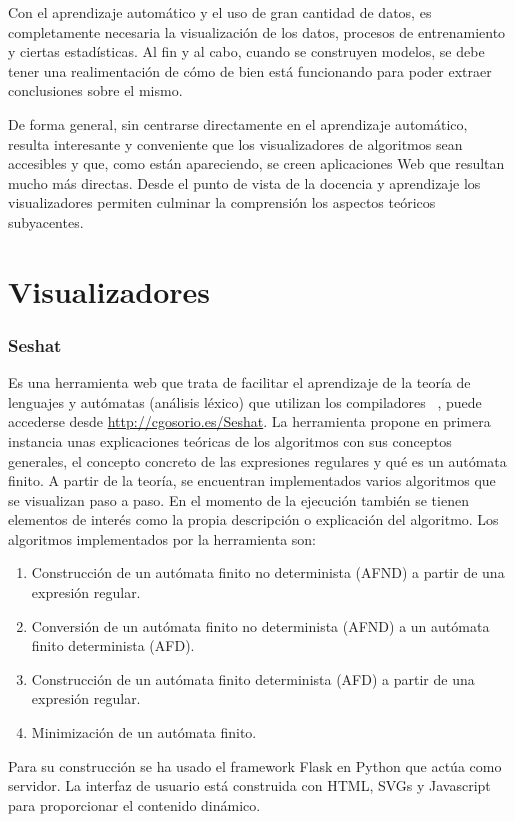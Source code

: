 
Con el aprendizaje automático y el uso de gran cantidad de datos, es
completamente necesaria la visualización de los datos, procesos de entrenamiento
y ciertas estadísticas. Al fin y al cabo, cuando se construyen modelos, se debe
tener una realimentación de cómo de bien está funcionando para poder extraer
conclusiones sobre el mismo.

De forma general, sin centrarse directamente en el aprendizaje automático,
resulta interesante y conveniente que los visualizadores de algoritmos sean
accesibles y que, como están apareciendo, se creen aplicaciones Web que resultan
mucho más directas. Desde el punto de vista de la docencia y aprendizaje los
visualizadores permiten culminar la comprensión los aspectos teóricos
subyacentes.

\section{Visualizadores}

\subsubsection{Seshat} 
Es una herramienta web que trata de facilitar el aprendizaje de
la teoría de lenguajes y autómatas (análisis léxico) que utilizan los
compiladores~\cite{arnaiz2018seshat} , puede accederse desde
\url{http://cgosorio.es/Seshat}. La herramienta propone en primera instancia
unas explicaciones teóricas de los algoritmos con sus conceptos generales, el
concepto concreto de las expresiones regulares y qué es un autómata finito. A
partir de la teoría, se encuentran implementados varios algoritmos que se
visualizan paso a paso. En el momento de la ejecución también se tienen
elementos de interés como la propia descripción o explicación del algoritmo. Los
algoritmos implementados por la herramienta son:
\begin{enumerate}
    \item Construcción de un autómata finito no determinista (AFND) a partir de una expresión regular.
    \item Conversión de un autómata finito no determinista (AFND) a un autómata finito determinista (AFD).
    \item Construcción de un autómata finito determinista (AFD) a partir de una expresión regular.
    \item Minimización de un autómata finito.
\end{enumerate}
Para su construcción se ha usado el framework Flask en Python que actúa como
servidor. La interfaz de usuario está construida con HTML, SVGs y Javascript
para proporcionar el contenido dinámico.

